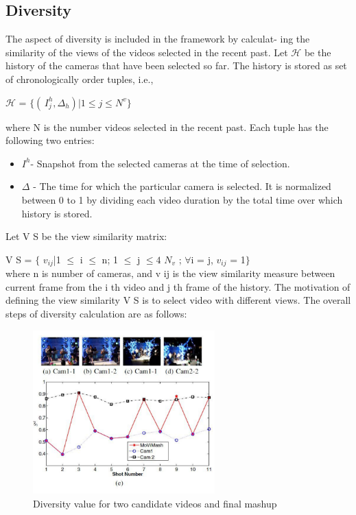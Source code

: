 \documentclass{sig-alternate-05-2015}
\begin{document}
\subsection{Diversity}
The aspect of diversity is included in the framework by calculat-
ing the similarity of the views of the videos selected in the recent
past. Let $\mathcal{H}$ be the history of the cameras that have been selected
so far. The history is stored as set of chronologically order tuples,
i.e.,         
\begin{center}
$\mathcal{H}$ = $\{( \,I_j^h,\Delta_h ) |1 \leq j \leq N^v\}$
\end{center}
where N is the number videos selected in the recent past. Each
tuple has the following two entries:
\begin{itemize}
\item $I^h $- Snapshot from the selected cameras at the time of selection.
\item $\Delta$ - The time for which the particular camera is selected. It
is normalized between 0 to 1 by dividing each video duration
by the total time over which history is stored.
\end{itemize}
Let V S be the view similarity matrix:

V S = $\{$ $v_{ij}$|1 $\leq$ i $\leq$ n; 1 $\leq$ j $\leq4$ $N_v$ ; $\forall$i = j, $v_{ij}$ = 1$\}$\\


where n is number of cameras, and v ij is the view similarity
measure between current frame from the i th video and j th frame
of the history. The motivation of defining the view similarity V S is
to select video with different views. The overall steps of diversity
calculation are as follows:

\begin{figure}
\centering
\includegraphics[width=70mm]{video_3.pdf}
\caption{Diversity value for two candidate videos and final
mashup}
\end{figure}
\end{document}

